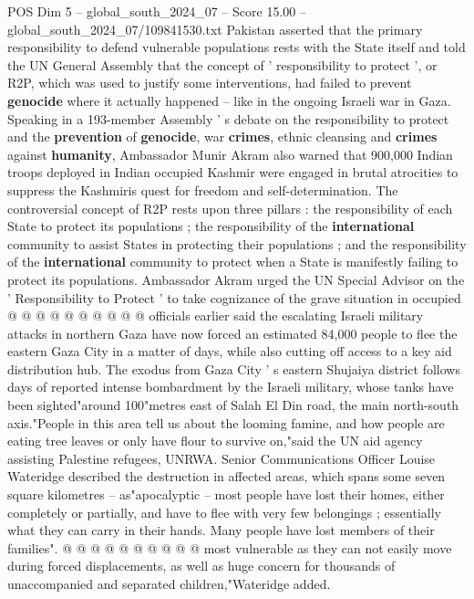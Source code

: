 \begin{textsample}{POS Dim 5 – global\_south\_2024\_07 – Score 15.00 – global\_south\_2024\_07/109841530.txt}  \label{ex:f5_pos_169}
Pakistan asserted that the primary responsibility to defend vulnerable populations rests with the State itself and told the UN General Assembly that the concept of ' responsibility to protect ', or R2P, which was used to justify some interventions, had failed to prevent \textbf{genocide} where it actually happened -- like in the ongoing Israeli war in Gaza.
Speaking in a 193-member Assembly ' s debate on the responsibility to protect and the \textbf{prevention} of \textbf{genocide}, war \textbf{crimes}, ethnic cleansing and \textbf{crimes} against \textbf{humanity}, Ambassador Munir Akram also warned that 900,000 Indian troops deployed in Indian occupied Kashmir were engaged in brutal atrocities to suppress the Kashmiris quest for freedom and self-determination.
The controversial concept of R2P rests upon three pillars : the responsibility of each State to protect its populations ; the responsibility of the \textbf{international} community to assist States in protecting their populations ; and the responsibility of the \textbf{international} community to protect when a State is manifestly failing to protect its populations.
Ambassador Akram urged the UN Special Advisor on the ' Responsibility to Protect ' to take cognizance of the grave situation in occupied @ @ @ @ @ @ @ @ @ @ officials earlier said the escalating Israeli military attacks in northern Gaza have now forced an estimated 84,000 people to flee the eastern Gaza City in a matter of days, while also cutting off access to a key aid distribution hub.
The exodus from Gaza City ' s eastern Shujaiya district follows days of reported intense bombardment by the Israeli military, whose tanks have been sighted"around 100"metres east of Salah El Din road, the main north-south axis."People in this area tell us about the looming famine, and how people are eating tree leaves or only have flour to survive on,"said the UN aid agency assisting Palestine refugees, UNRWA.
Senior Communications Officer Louise Wateridge described the destruction in affected areas, which spans some seven square kilometres -- as"apocalyptic -- most people have lost their homes, either completely or partially, and have to flee with very few belongings ; essentially what they can carry in their hands.
Many people have lost members of their families". @ @ @ @ @ @ @ @ @ @ most vulnerable as they can not easily move during forced displacements, as well as huge concern for thousands of unaccompanied and separated children,"Wateridge added.

\end{textsample}
